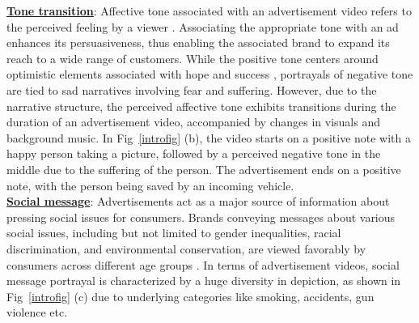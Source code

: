 \textbf{\underline{Tone transition}}: Affective tone associated with an advertisement video refers to the perceived feeling by a viewer \cite{Veer2008HowTT}. Associating the appropriate tone with an ad enhances its persuasiveness, thus enabling the associated brand to expand its reach to a wide range of customers. While the positive tone centers around optimistic elements associated with hope and success \cite{Brooks2020ExploringAO}, portrayals of negative tone are tied to sad narratives involving fear and suffering. However, due to the narrative structure, the perceived affective tone exhibits transitions during the duration of an advertisement video, accompanied by changes in visuals and background music.  In Fig~\ref{introfig} (b), the video starts on a positive note with a happy person taking a picture, followed by a perceived negative tone in the middle due to the suffering of the person. The advertisement ends on a positive note, with the person being saved by an incoming vehicle.\\

\textbf{\underline{Social message}}: Advertisements act as a major source of information about pressing social issues for consumers. Brands conveying messages about various social issues, including but not limited to gender inequalities, racial discrimination, and environmental conservation, are viewed favorably by consumers across different age groups \cite{Brooks2020ExploringAO}. In terms of advertisement videos, social message portrayal is characterized by a huge diversity in depiction, as shown in Fig~\ref{introfig} (c) due to underlying categories like smoking, accidents, gun violence etc.

